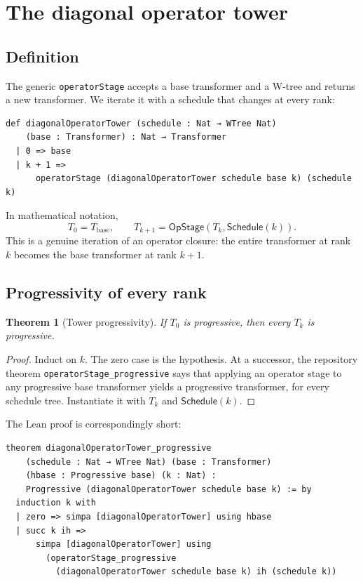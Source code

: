 \documentclass[11pt]{article}
\newtheorem{theorem}{Theorem}[section]
\theoremstyle{definition}
\theoremstyle{remark}
\newcommand{\lean}[1]{\texttt{#1}}
\newcommand{\opstage}{\mathsf{OpStage}}
\newcommand{\sched}{\mathsf{Schedule}}
\begin{document}
\section{The diagonal operator tower}

\subsection{Definition}

The generic \lean{operatorStage} accepts a base transformer and a W-tree and
returns a new transformer.  We iterate it with a schedule that changes at every
rank:

\begin{lstlisting}
def diagonalOperatorTower (schedule : Nat → WTree Nat)
    (base : Transformer) : Nat → Transformer
  | 0 => base
  | k + 1 =>
      operatorStage (diagonalOperatorTower schedule base k) (schedule k)
\end{lstlisting}

In mathematical notation,
\[
T_0=T_{\mathrm{base}},\qquad
T_{k+1}=\opstage(T_k,\sched(k)).
\]
This is a genuine iteration of an operator closure: the entire transformer at
rank $k$ becomes the base transformer at rank $k+1$.

\subsection{Progressivity of every rank}

\begin{theorem}[Tower progressivity]
If $T_0$ is progressive, then every $T_k$ is progressive.
\end{theorem}

\begin{proof}
Induct on $k$.  The zero case is the hypothesis.  At a successor, the
repository theorem \lean{operatorStage\_progressive} says that applying an
operator stage to any progressive base transformer yields a progressive
transformer, for every schedule tree.  Instantiate it with $T_k$ and
$\sched(k)$.
\end{proof}

The Lean proof is correspondingly short:

\begin{lstlisting}
theorem diagonalOperatorTower_progressive
    (schedule : Nat → WTree Nat) (base : Transformer)
    (hbase : Progressive base) (k : Nat) :
    Progressive (diagonalOperatorTower schedule base k) := by
  induction k with
  | zero => simpa [diagonalOperatorTower] using hbase
  | succ k ih =>
      simpa [diagonalOperatorTower] using
        (operatorStage_progressive
          (diagonalOperatorTower schedule base k) ih (schedule k))
\end{lstlisting}
\end{document}

